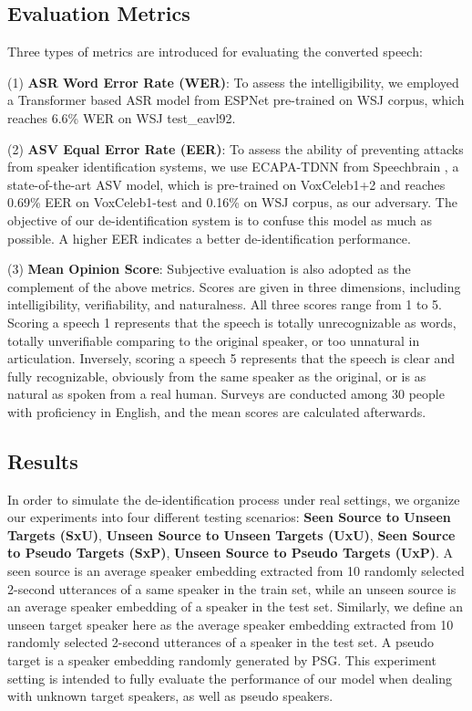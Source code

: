 \documentclass[a4paper]{article}
\begin{document}
\subsection{Evaluation Metrics}
    Three types of metrics are introduced for evaluating the converted speech: 
    
    (1) \textbf{ASR Word Error Rate (WER)}: To assess the intelligibility, we employed a Transformer based ASR model from ESPNet \cite{watanabe2018espnet} pre-trained on WSJ corpus, which reaches 6.6\% WER on WSJ test\_eavl92. 
    
    (2) \textbf{ASV Equal Error Rate (EER)}: To assess the ability of preventing attacks from speaker identification systems, we use ECAPA-TDNN \cite{desplanques2020ecapa} from Speechbrain \cite{speechbrain}, a state-of-the-art ASV model, which is pre-trained on VoxCeleb1+2 and reaches 0.69\% EER on VoxCeleb1-test and 0.16\% on WSJ corpus, as our adversary. The objective of our de-identification system is to confuse this model as much as possible. A higher EER indicates a better de-identification performance. 
    
    (3) \textbf{Mean Opinion Score}: Subjective evaluation is also adopted as the complement of the above metrics. Scores are given in three dimensions, including intelligibility, verifiability, and naturalness. All three scores range from 1 to 5. Scoring a speech 1 represents that the speech is totally unrecognizable as words, totally unverifiable comparing to the original speaker, or too unnatural in articulation. Inversely, scoring a speech 5 represents that the speech is clear and fully recognizable, obviously from the same speaker as the original, or is as natural as spoken from a real human. Surveys are conducted among 30 people with proficiency in English, and the mean scores are calculated afterwards.

\subsection{Results}
In order to simulate the de-identification process under real settings, we organize our experiments into four different testing scenarios: \textbf{Seen Source to Unseen Targets (SxU)}, \textbf{Unseen Source to Unseen Targets (UxU)}, \textbf{Seen Source to Pseudo Targets (SxP)}, \textbf{Unseen Source to Pseudo Targets (UxP)}. A seen source is an average speaker embedding extracted from 10 randomly selected 2-second utterances of a same speaker in the train set, while an unseen source is an average speaker embedding of a speaker in the test set. Similarly, we define an unseen target speaker here as the average speaker embedding extracted from 10 randomly selected 2-second utterances of a speaker in the test set. A pseudo target is a speaker embedding randomly generated by PSG. This experiment setting is intended to fully evaluate the performance of our model when dealing with unknown target speakers, as well as pseudo speakers.
\end{document}
